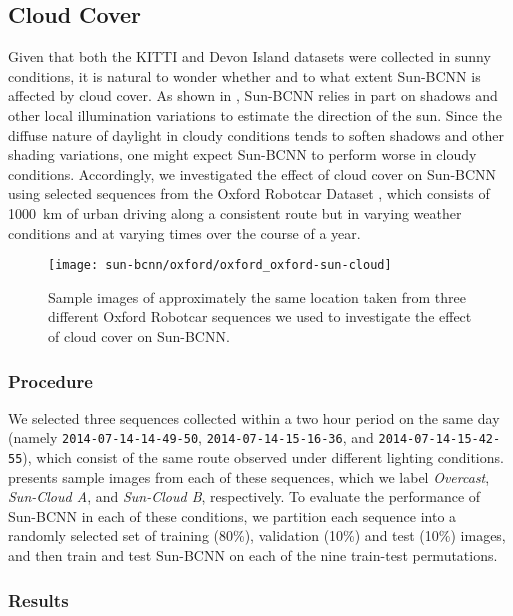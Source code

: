 \subsection{Cloud Cover}
Given that both the KITTI and Devon Island datasets were collected in sunny conditions, it is natural to wonder whether and to what extent Sun-BCNN is affected by cloud cover. 
As shown in , Sun-BCNN relies in part on shadows and other local illumination variations to estimate the direction of the sun.
Since the diffuse nature of daylight in cloudy conditions tends to soften shadows and other shading variations, one might expect Sun-BCNN to perform worse in cloudy conditions.
Accordingly, we investigated the effect of cloud cover on Sun-BCNN using selected sequences from the Oxford Robotcar Dataset \citep{Maddern2016-ng}, which consists of 1000~km of urban driving along a consistent route but in varying weather conditions and at varying times over the course of a year.

\begin{figure}
    \centering
    \texttt{[image: sun-bcnn/oxford/oxford\_oxford-sun-cloud]}
    \caption{Sample images of approximately the same location taken from three different Oxford Robotcar sequences we used to investigate the effect of cloud cover on Sun-BCNN.}
    \label{fig:oxford-images}
\end{figure}

\subsubsection{Procedure}
We selected three sequences collected within a two hour period on the same day (namely \texttt{2014-07-14-14-49-50}, \texttt{2014-07-14-15-16-36}, and \texttt{2014-07-14-15-42-55}), which consist of the same route observed under different lighting conditions. 
  presents sample images from each of these sequences, which we label \emph{Overcast}, \emph{Sun-Cloud A}, and \emph{Sun-Cloud B}, respectively.
To evaluate the performance of Sun-BCNN in each of these conditions, we partition each sequence into a randomly selected set of training (80\%), validation (10\%) and test (10\%) images, and then train and test Sun-BCNN on each of the nine train-test permutations. 

\subsubsection{Results}

